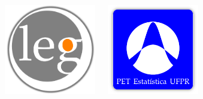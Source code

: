 \begin{frame}

  \begin{columns}[t]
    \begin{center}
      \includegraphics[width=4cm]{./images/leg.png}
    \end{center}
    \hfill
    \begin{center}
      \includegraphics[width=4cm]{./images/pet.png}
    \end{center}
  \end{columns}

\end{frame}
